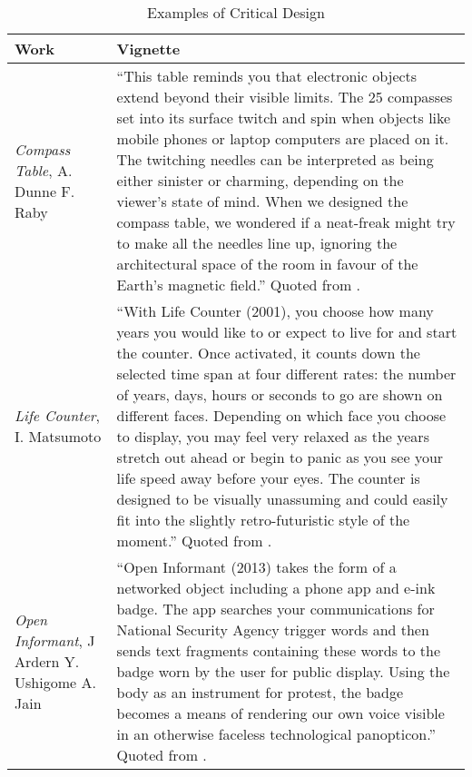 
\begin{table*}
\centering
\caption{Examples of Critical Design\label{tab:examples}}
\begin{tabular}{|p{2.5cm}|p{11cm}|} 
\hline

Work & Vignette \\ \hline

\textit{Compass Table}, \newline A. Dunne \newline F. Raby &
``This table reminds you that electronic objects extend beyond their visible limits. The 25 compasses set into its surface twitch and spin when objects like mobile phones or laptop computers are placed on it. The twitching needles can be interpreted as being either sinister or charming, depending on the viewer's state of mind. When we designed the compass table, we wondered if a neat-freak might try to make all the needles line up, ignoring the architectural space of the room in favour of the Earth's magnetic field.'' Quoted from \cite{DuRa01}. \\ \hline

\textit{Life Counter}, \newline I. Matsumoto &
``With Life Counter (2001), you choose how many years you would like to or expect to live for and start the counter. Once activated, it counts down the selected time span at four different rates: the number of years, days, hours or seconds to go are shown on different faces. Depending on which face you choose to display, you may feel very relaxed as the years stretch out ahead or begin to panic as you see your life speed away before your eyes. The counter is designed to be visually unassuming and could easily fit into the slightly retro-futuristic style of the moment.'' Quoted from \cite{DuRa01}. \\ \hline

\textit{Open Informant}, \newline J Ardern \newline Y. Ushigome \newline A. Jain &
``Open Informant (2013) takes the form of a networked object including a phone app and e-ink badge. The app searches your communications for National Security Agency trigger words and then sends text fragments containing these words to the badge worn by the user for public display. Using the body as an instrument for protest, the badge becomes a means of rendering our own voice visible in an otherwise faceless technological panopticon.'' Quoted from \cite{Mal17}. \\ \hline

\end{tabular}
\end{table*}